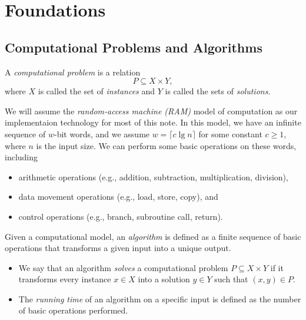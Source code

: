 \chapter{Foundations}
\section{Computational Problems and Algorithms}
\begin{definition}
  A \emph{computational problem} is a relation
  \begin{equation*}
    P \subseteq X \times Y,
  \end{equation*}
  where $X$ is called the set of \emph{instances} and $Y$ is called the sets of
  \emph{solutions}.
\end{definition}

\begin{definition}
  We will assume the \emph{random-access machine (RAM)} model of computation as
  our implementaion technology for most of this note.
  In this model, we have an infinite sequence of $w$-bit words, and we assume
  $w = \lceil c \lg n \rceil$ for some constant $c \geq 1$, where $n$ is the
  input size.
  We can perform some basic operations on these words, including
  \begin{itemize}
    \item arithmetic operations (e.g., addition, subtraction, multiplication,
    division),
    \item data movement operations (e.g., load, store, copy), and
    \item control operations (e.g., branch, subroutine call, return).
  \end{itemize}
\end{definition}

\begin{definition}
  Given a computational model, an \emph{algorithm} is defined as a finite
  sequence of basic operations that transforms a given input into a unique
  output.
  \begin{itemize}
    \item We say that an algorithm \emph{solves} a computational problem
    $P \subseteq X \times Y$ if it transforms every instance $x \in X$ into a
    solution $y \in Y$ such that $(x, y) \in P$.
    \item The \emph{running time} of an algorithm on a specific input is
    defined as the number of basic operations performed.
  \end{itemize}
\end{definition}
